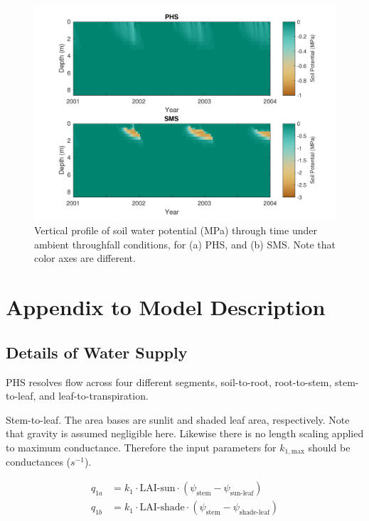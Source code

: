 \documentclass[draft,linenumbers]{agujournal}
\begin{document}
  
        \clearpage
    \begin{figure}[h]
     \centering
     \includegraphics[width=30pc]{../figs2/suppsmp.pdf}
     \caption{Vertical profile of soil water potential (MPa) through time under ambient throughfall conditions, for
     (a) PHS, and 
     (b) SMS.
     Note that color axes are different. }
     \label{supp:smp}
  \end{figure}



\section{Appendix to Model Description}

\subsection{Details of Water Supply}

PHS resolves flow across four different segments, soil-to-root, root-to-stem, stem-to-leaf, and leaf-to-transpiration.

Stem-to-leaf. The area bases are sunlit and shaded leaf area, respectively. 
Note that gravity is assumed negligible here. 
Likewise there is no length scaling applied to maximum conductance. 
Therefore the input parameters for $k_{1,\text{max}}$ should be conductances ($s^{-1}$).

\begin{linenomath*} \begin{equation} \begin{aligned}
q_{1a} &= k_{1} \cdot \text{LAI-sun}  \cdot \left( \psi_{\text{stem}}-\psi_{\text{sun-leaf}}\right) \\
q_{1b} &= k_{1} \cdot \text{LAI-shade} \cdot  \left( \psi_{\text{stem}}-\psi_{\text{shade-leaf}}\right)
\end{aligned} \end{equation} \end{linenomath*}
\end{document}
